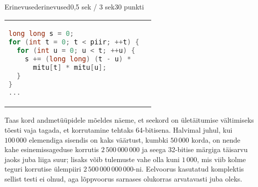 \begin{yl}{3}{Erinevused}{erinevused}{0,5 sek / 3 sek}{30 punkti}
\begin{tabular}{p{\colwidth} p{\colwidth}}
\begin{lstlisting}[language=C++]
long long s = 0;
for (int t = 0; t < piir; ++t) {
  for (int u = 0; u < t; ++u) {
    s += (long long) (t - u) *
      mitu[t] * mitu[u];
  }
}
...
\end{lstlisting}
\end{tabular}

Taas kord andmetüüpidele mõeldes näeme, et seekord on ületäitumise vältimiseks tõesti vaja tagada, et korrutamine tehtaks 64-bitisena. Halvimal juhul, kui $100\,000$ elemendiga sisendis on kaks väärtust, kumbki $50\,000$ korda, on nende kahe esinemissageduse korrutis $2\,500\,000\,000$ ja seega 32-bitise märgiga täisarvu jaoks juba liiga suur; lisaks võib tulemuste vahe olla kuni $1\,000$, mis viib kolme teguri korrutise ülempiiri $2\,500\,000\,000\,000$-ni. Eelvoorus kasutatud komplektis sellist testi ei olnud, aga lõppvoorus sarnases olukorras arvatavasti juba oleks.

\end{yl}
